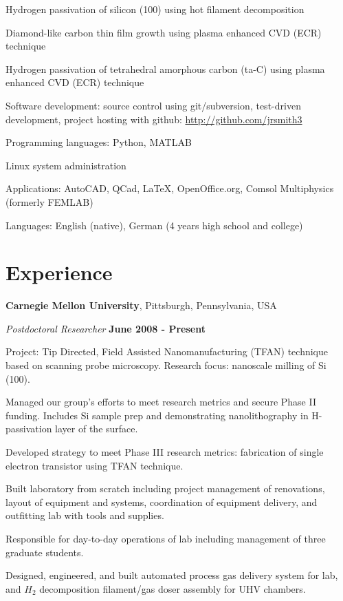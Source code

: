\documentclass[letterpaper,margin,line]{res}
\newenvironment{list1}{
  \begin{list}{\ding{113}}{%
      \setlength{\itemsep}{0in}
      \setlength{\parsep}{0in} \setlength{\parskip}{0in}
      \setlength{\topsep}{0in} \setlength{\partopsep}{0in} 
      \setlength{\leftmargin}{0.17in}}}{\end{list}}
\begin{document}
\begin{resume}
\vspace*{-2.5mm}
Hydrogen passivation of silicon (100) using hot filament decomposition

\vspace*{-2.5mm}
Diamond-like carbon thin film growth using plasma enhanced CVD (ECR) technique

\vspace*{-2.5mm}
Hydrogen passivation of tetrahedral amorphous carbon (ta-C) using plasma enhanced CVD (ECR) technique

\vspace*{-2.5mm}
Software development: source control using git/subversion, test-driven development, project hosting with github: \href{http://github.com/jrsmith3}{http://github.com/jrsmith3}

\vspace*{-2.5mm}
Programming languages: Python, MATLAB

\vspace*{-2.5mm}
Linux system administration

\vspace*{-2.5mm}
Applications: AutoCAD, QCad, \LaTeX, OpenOffice.org, Comsol Multiphysics (formerly FEMLAB)

\vspace*{-2.5mm}
Languages: English (native), German (4 years high school and college)

\section{\sc Experience}
{\bf Carnegie Mellon University}, Pittsburgh, Pennsylvania, USA

\vspace{-.3cm}
{\em Postdoctoral Researcher} \hfill {\bf June 2008 - Present}\\
\begin{list1}
\item[] Project: Tip Directed, Field Assisted Nanomanufacturing (TFAN) technique based on scanning probe microscopy. Research focus: nanoscale milling of Si (100).
\item[] Managed our group's efforts to meet research metrics and secure Phase II funding. Includes Si sample prep and demonstrating nanolithography in H-passivation layer of the surface.
\item[] Developed strategy to meet Phase III research metrics: fabrication of single electron transistor using TFAN technique.
\item[] Built laboratory from scratch including project management of renovations, layout of equipment and systems, coordination of equipment delivery, and outfitting lab with tools and supplies.
\item[] Responsible for day-to-day operations of lab including management of three graduate students.
\item[] Designed, engineered, and built automated process gas delivery system for lab, and $H_{2}$ decomposition filament/gas doser assembly for UHV chambers.
\end{list1}



\end{resume}
\end{document}
